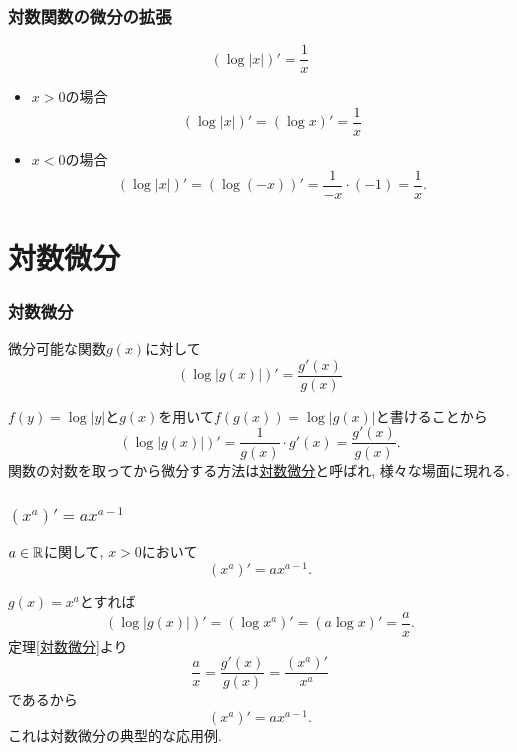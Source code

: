 

\begin{frame}
\frametitle{対数関数の微分の拡張}


\begin{Thm} 
$$(\log |x|)'=\frac{1}{x}$$
\end{Thm}

\begin{itemize}
\item $x>0$の場合
$$
(\log |x|)' = (\log x)'=\frac{1}{x}
$$
\item $x<0$の場合
$$
(\log |x|)' = (\log (-x))'=\frac{1}{-x} \cdot (-1)=\frac{1}{x}. 
$$
\end{itemize}


\end{frame}




\section{対数微分}

\begin{frame}
\frametitle{対数微分}



\begin{Thm} \label{対数微分}
微分可能な関数$g(x)$に対して
$$(\log |g(x)|)'=\frac{g'(x)}{g(x)}$$
\end{Thm}

$f(y)=\log |y|$と$g(x)$を用いて$f(g(x))=\log|g(x)|$と書けることから
$$
(\log |g(x)|)'=\frac{1}{g(x)}\cdot g'(x)=\frac{g'(x)}{g(x)}. 
$$
関数の対数を取ってから微分する方法は\underline{対数微分}と呼ばれ, 様々な場面に現れる. 

\end{frame}




\begin{frame}
\frametitle{$(x^a)'=ax^{a-1}$}



\begin{Thm} 
$a \in \mathbb{R}$に関して, $x>0$において
$$
(x^a)'=ax^{a-1}.
$$
\end{Thm}
$g(x)=x^a$とすれば
$$
(\log |g(x)|)'= (\log x^a)'= (a \log x)'=\frac{a}{x}. 
$$
定理\ref{対数微分}より
$$
\frac{a}{x}=\frac{g'(x)}{g(x)}=\frac{(x^a)'}{x^a}
$$
であるから
$$
(x^a)'=a x^{a-1}. 
$$
これは対数微分の典型的な応用例. 

\end{frame}


